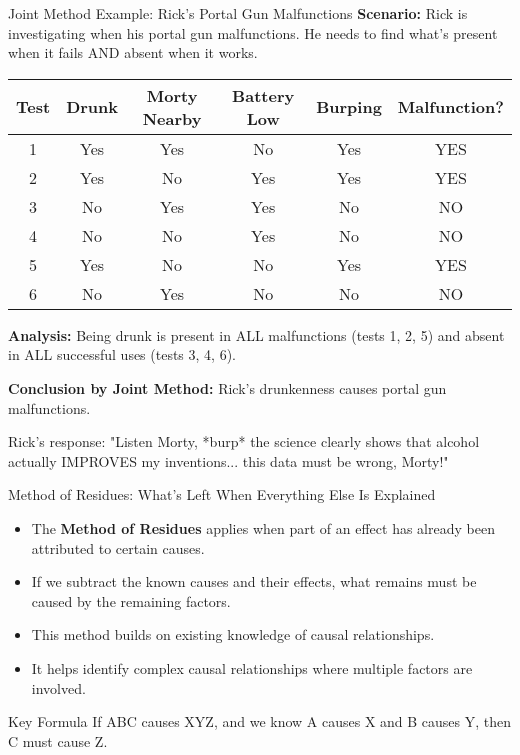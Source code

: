 \documentclass{beamer}
\begin{document}
\begin{frame}{Joint Method Example: Rick's Portal Gun Malfunctions}
	\textbf{Scenario:} Rick is investigating when his portal gun malfunctions. He needs to find what's present when it fails AND absent when it works.
	
	\begin{table}
		\scriptsize
		\centering
		\begin{tabular}{|c|c|c|c|c|c|}
			\hline
			\textbf{Test} & \textbf{Drunk} & \textbf{Morty Nearby} & \textbf{Battery Low} & \textbf{Burping} & \textbf{Malfunction?} \\
			\hline
			1 & Yes & Yes & No & Yes & YES \\
			2 & Yes & No & Yes & Yes & YES \\
			3 & No & Yes & Yes & No & NO \\
			4 & No & No & Yes & No & NO \\
			5 & Yes & No & No & Yes & YES \\
			6 & No & Yes & No & No & NO \\
			\hline
		\end{tabular}
	\end{table}
	
	\textbf{Analysis:} Being drunk is present in ALL malfunctions (tests 1, 2, 5) and absent in ALL successful uses (tests 3, 4, 6).
	
	\textbf{Conclusion by Joint Method:} Rick's drunkenness causes portal gun malfunctions.
	
	\begin{alertblock}{Rick's response:}
		"Listen Morty, *burp* the science clearly shows that alcohol actually IMPROVES my inventions... this data must be wrong, Morty!"
	\end{alertblock}
\end{frame}

\begin{frame}{Method of Residues: What's Left When Everything Else Is Explained}
    \begin{itemize}
        \item The \textbf{Method of Residues} applies when part of an effect has already been attributed to certain causes.
        \item If we subtract the known causes and their effects, what remains must be caused by the remaining factors.
        \item This method builds on existing knowledge of causal relationships.
        \item It helps identify complex causal relationships where multiple factors are involved.
    \end{itemize}
    
    \begin{alertblock}{Key Formula}
        If ABC causes XYZ, and we know A causes X and B causes Y, then C must cause Z.
    \end{alertblock}
\end{frame}
\end{document}

